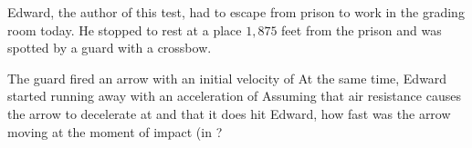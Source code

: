 Edward, the author of this test, had to escape from prison to work in the grading room today. He stopped to rest at a place $1,875$ feet from the prison and was spotted by a guard with a crossbow.

The guard fired an arrow with an initial velocity of   At the same time, Edward started running away with an acceleration of   Assuming that air resistance causes the arrow to decelerate at  and that it does hit Edward, how fast was the arrow moving at the moment of impact (in ?